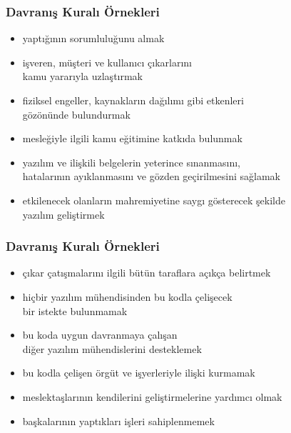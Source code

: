 \documentclass[dvipsnames]{beamer}
\theoremstyle{definition}
\theoremstyle{example}
\theoremstyle{plain}
\begin{document}
\begin{frame}
  \frametitle{Davranış Kuralı Örnekleri}

  \begin{itemize}
    \item yaptığının sorumluluğunu almak
    \item işveren, müşteri ve kullanıcı çıkarlarını\\
      kamu yararıyla uzlaştırmak
    \item fiziksel engeller, kaynakların dağılımı gibi etkenleri\\
      gözönünde bulundurmak
    \item mesleğiyle ilgili kamu eğitimine katkıda bulunmak
    \item yazılım ve ilişkili belgelerin yeterince sınanmasını,\\
      hatalarının ayıklanmasını ve gözden geçirilmesini sağlamak
    \item etkilenecek olanların mahremiyetine saygı gösterecek şekilde\\
      yazılım geliştirmek
  \end{itemize}
\end{frame}

\begin{frame}
  \frametitle{Davranış Kuralı Örnekleri}

  \begin{itemize}
    \item çıkar çatışmalarını ilgili bütün taraflara açıkça belirtmek
    \item hiçbir yazılım mühendisinden bu kodla çelişecek\\
      bir istekte bulunmamak
    \item bu koda uygun davranmaya çalışan\\
      diğer yazılım mühendislerini desteklemek
    \item bu kodla çelişen örgüt ve işyerleriyle ilişki kurmamak
    \item meslektaşlarının kendilerini geliştirmelerine yardımcı olmak
    \item başkalarının yaptıkları işleri sahiplenmemek
  \end{itemize}
\end{frame}
\end{document}
